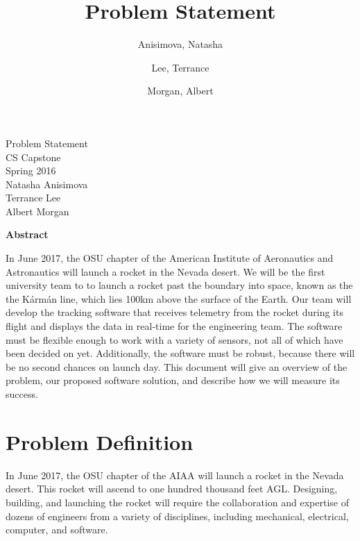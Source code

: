 \documentclass[10pt,journal,draftclsnofoot,onecolumn]{IEEEtran}
\begin{document}
\singlespace

\title{\vspace{2in}Problem Statement}

\author {
	Anisimova, Natasha
	\and
	Lee, Terrance
	\and
	Morgan, Albert
}


\pagestyle{empty}
\vspace*{2in}
\begin{center}
\huge
Problem Statement\\
\normalsize
\vspace{5mm}
CS Capstone\\
Spring 2016\\
\vspace{5mm}
Natasha Anisimova\\
Terrance Lee\\
Albert Morgan
\end{center}

\vspace{5mm}

\begin{center}
\textbf{Abstract}
\end{center}

\begin{adjustwidth}{2in}{2in}
In June 2017, the \ac{OSU} chapter of the
American Institute of Aeronautics and Astronautics will launch a rocket in the Nevada desert.
We will be the first university team to to launch a rocket past the boundary into space,
known as the the K\'{a}rm\'{a}n line, which lies 100km above the surface of the Earth.
Our team will develop the tracking software that receives
telemetry from the rocket during its flight
and displays the data in real-time for the engineering team.
The software must be flexible enough to work with a variety of sensors,
not all of which have been decided on yet.
Additionally, the software must be robust,
because there will be no second chances on launch day.
This document will give an overview of the problem,
our proposed software solution,
and describe how we will measure its success.
\end{adjustwidth}

\newpage
\pagestyle{headings}
\section{Problem Definition}
In June 2017, the \ac{OSU} chapter of the
\ac{AIAA} will launch a rocket in the Nevada desert.
This rocket will ascend to one hundred thousand feet \ac{AGL}.
Designing, building, and launching the rocket will require the
collaboration and expertise of dozens of engineers from a variety
of disciplines, including mechanical, electrical, computer, and
software.
\end{document}
